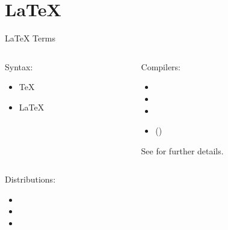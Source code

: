 \documentclass{setbeamer}
\begin{document}
\section{\LaTeX{}}
\begin{frame}{\LaTeX{} Terms}
    \begin{columns}
        \begin{column}{0.45\textwidth}
            Syntax:
            \begin{itemize}
                \item \TeX{}
                \item \LaTeX{}
            \end{itemize}
        \end{column}

        \begin{column}{0.5\textwidth}
            Compilers:
            \begin{itemize}
                \item {}
                \item {}
                \item {}
                \item ()
            \end{itemize}
            {\scriptsize See  for further details.\par}
        \end{column}
    \end{columns}


    \vspace{3mm}
    \begin{columns}
        \begin{column}{0.45\textwidth}
            Distributions:
            \begin{itemize}
                \item {}
                \item {}
                \item {}
            \end{itemize}
        \end{column}


\end{columns}
\end{frame}
\end{document}
